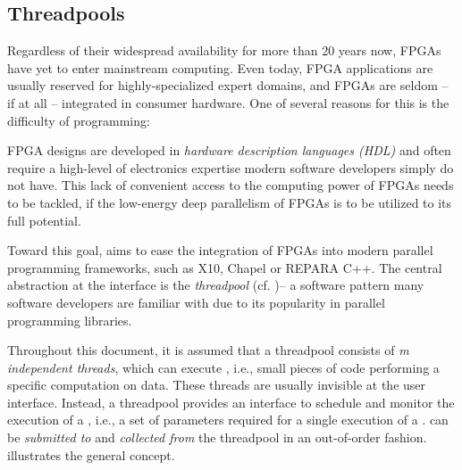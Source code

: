 \subsection*{Threadpools}
Regardless of their widespread availability for more than 20 years now, FPGAs have yet to enter mainstream computing.
Even today, FPGA applications are usually reserved for highly-specialized expert domains, and FPGAs are seldom -- if at all -- integrated in consumer hardware.
One of several reasons for this is the difficulty of programming:

FPGA designs are developed in \emph{hardware description languages (HDL)} and often require a high-level of electronics expertise modern software developers simply do not have.
This lack of convenient access to the computing power of FPGAs needs to be tackled, if the low-energy deep parallelism of FPGAs is to be utilized to its full potential.

\medskip
Toward this goal, \tapasco{} aims to ease the integration of FPGAs into modern parallel programming frameworks, such as X10, Chapel or REPARA C++.
The central abstraction at the interface is the \emph{threadpool} (cf. \cite{threadpool})-- a software pattern many software developers are familiar with due to its popularity in parallel programming libraries.

Throughout this document, it is assumed that a threadpool consists of \emph{m independent threads}, which can execute , i.e., small pieces of code performing a specific computation on data.
These threads are usually invisible at the user interface.
Instead, a threadpool provides an interface to schedule and monitor the execution of a , i.e., a set of parameters required for a single execution of a .
 can be \emph{submitted to} and \emph{collected from} the threadpool in an out-of-order fashion.
 illustrates the general concept.

